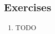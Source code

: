 \documentclass[book.tex]{subfiles}
\begin{document}

 
\subsection{Exercises}
\begin{enumerate}
    \item TODO
\end{enumerate}
\end{document}
